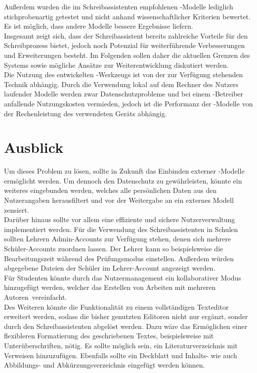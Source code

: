 \documentclass[../main.tex]{subfiles}
\begin{document}
Außerdem wurden die im Schreibassistenten empfohlenen -Modelle lediglich stichprobenartig getestet und nicht anhand wissenschaftlicher Kriterien bewertet. Es ist möglich, dass andere Modelle
bessere Ergebnisse liefern.\\
Insgesamt zeigt sich, dass der Schreibassistent bereits zahlreiche Vorteile für den Schreibprozess bietet, jedoch noch Potenzial für weiterführende Verbesserungen und Erweiterungen 
besteht. Im Folgenden sollen daher die aktuellen Grenzen des Systems sowie mögliche Ansätze zur Weiterentwicklung diskutiert werden.\\
Die Nutzung des entwickelten -Werkzeugs ist von der zur Verfügung stehenden Technik abhängig. Durch die Verwendung lokal auf dem Rechner des Nutzers laufender Modelle werden zwar 
Datenschutzprobleme und bei einem -Betreiber anfallende Nutzungskosten vermieden, jedoch ist die Performanz der -Modelle von der Rechenleistung des verwendeten Geräts abhängig. 


\section{Ausblick}
Um dieses Problem zu lösen, sollte in Zukunft das Einbinden externer -Modelle ermöglicht werden. Um dennoch den Datenschutz zu gewährleisten, könnte ein weiteres 
eingebunden werden, welches alle persönlichen Daten aus den Nutzerangaben herausfiltert und vor der Weitergabe an ein externes Modell zensiert.\\ 
Darüber hinaus sollte vor allem eine effiziente und sichere Nutzerverwaltung implementiert werden. Für die Verwendung des Schreibassistenten in Schulen sollten Lehrern Admin-Accounts 
zur Verfügung stehen, denen sich mehrere Schüler-Accounts zuordnen lassen. Der Lehrer kann so beispielsweise die Bearbeitungszeit während des Prüfungsmodus einstellen. Außerdem 
würden abgegebene Dateien der Schüler im Lehrer-Account angezeigt werden.\\
Für Studenten könnte durch das Nutzermanagement ein kollaborativer Modus hinzugefügt werden, welcher das Erstellen von Arbeiten mit mehreren \mbox{Autoren vereinfacht.}\\
Des Weiteren könnte die Funktionalität zu einem vollständigen Texteditor erweitert werden, sodass die bisher genutzten Editoren nicht nur ergänzt, sonder durch den Schreibassistenten 
abgelöst werden. Dazu wäre das Ermöglichen einer flexibleren Formatierung des geschriebenen Textes, beispielsweise mit Unterüberschriften, nötig. Es sollte möglich sein, ein 
Literaturverzeichnis mit Verweisen hinzuzufügen. Ebenfalls sollte ein Deckblatt und Inhalts- wie auch Abbildungs- und Abkürzungsverzeichnis eingefügt werden können.
\end{document}
